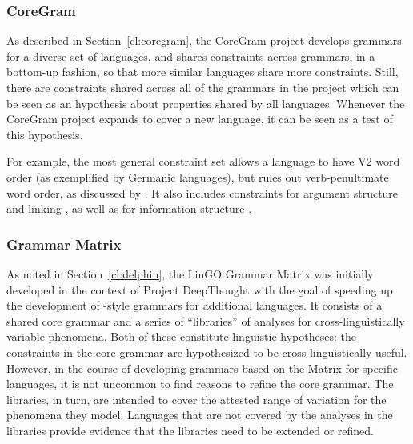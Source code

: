 \documentclass[output=paper,nonflat]{langsci/langscibook}
\begin{document}
\subsubsection{CoreGram}
\label{cl:lang-doc:coregram}

As described in Section~\ref{cl:coregram},
the CoreGram project develops grammars for a diverse set of languages,
and shares constraints across grammars, in a bottom-up fashion, so that more
similar languages share more constraints. Still, there are constraints
shared across all of the grammars in the project which can be seen
as an hypothesis about properties shared by all languages.
Whenever the CoreGram project expands to cover a new language,
it can be seen as a test of this hypothesis.

For example, the most general constraint set
allows a language to have V2 word order
(as exemplified by Germanic languages),
but rules out verb-penultimate word order,
as discussed by \citet{MuellerCoreGram}
.
It also includes constraints for argument structure and linking
,
as well as for information structure
.



\subsubsection{Grammar Matrix}
\label{cl:lang-doc:gmcs}

As noted in Section~\ref{cl:delphin}, the LinGO Grammar Matrix
\citep{BFO2002a-u,BDFPS2010a-u} was initially developed in
the context of Project DeepThought with the goal of speeding up the
development of \delphin-style grammars for additional languages. It
consists of a shared core grammar and a series of ``libraries'' of
analyses for cross-linguistically variable phenomena. Both of these
constitute linguistic hypotheses: the constraints
in the core grammar are hypothesized to be cross-linguistically
useful. However, in the course of developing grammars based on the
Matrix for specific languages, it is not uncommon to find reasons to
refine the core grammar. The libraries, in turn, are intended to 
cover the attested range of variation for the phenomena they model.
Languages that are not covered by the analyses in the libraries provide
evidence that the libraries need to be extended or refined. 
\end{document}
